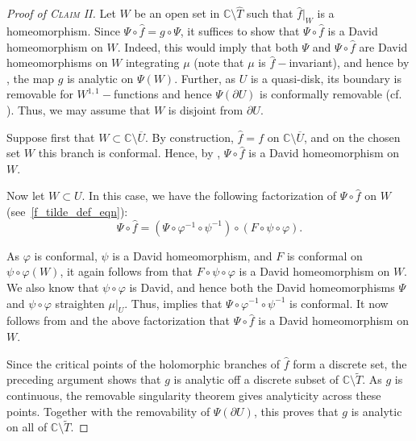 \documentclass[11pt,a4paper, oneside]{amsart}
\theoremstyle{definition}
\theoremstyle{remark}
\numberwithin{equation}{section}
\renewcommand{\hat}{\widehat}
\newcommand{\C}{\mathbb{C}}
\renewcommand{\tilde}{\widetilde}
\renewcommand{\phi}{\varphi}
\begin{document}
\begin{proof}[Proof of \textsc{Claim II}]
Let $W$ be an open set in $\C\setminus\widehat{T}$ such that $\hat f \vert_W$ is a homeomorphism. Since $\Psi\circ\hat f=g\circ \Psi$, it suffices to show that $\Psi\circ\hat f$ is a David homeomorphism on $W$. Indeed, this would imply that both $\Psi$ and $\Psi\circ\hat f$ are David homeomorphisms on $W$ integrating $\mu$ (note that $\mu$ is $\hat f-$invariant), and hence by \cite[Theorem~20.4.19, p.~565]{David}, the map $g$ is analytic on {$\Psi(W)$}.
Further, as $U$ is a quasi-disk, its boundary is removable for $W^{1,1}-$functions and hence $\Psi(\partial U)$ is conformally removable (cf. \cite[\S 2]{LMMN}). Thus, we may assume that $W$ is disjoint from $\partial U$.

Suppose first that $W\subset \C\setminus\overline{U}$. By construction, $\hat f=f$ on $\C\setminus\overline{U}$, and {on the chosen set $W$ this branch is conformal}. Hence, by \cite[Proposition~2.5, part (ii)]{LMMN}, $\Psi\circ\hat f$ is a David homeomorphism on $W$.



Now let $W\subset U$. In this case, we have the following factorization of $\Psi\circ\hat f$ on $W$ (see~\eqref{f_tilde_def_eqn}):
$$
\Psi\circ\hat f = \left(\Psi\circ\phi^{-1}\circ\psi^{-1}\right)\circ\left(F\circ \psi\circ\phi\right).
$$


As $\phi$ is conformal, $\psi$ is a David homeomorphism, and {$F$ is conformal on  $\psi\circ\phi(W)$}, it again follows from \cite[Proposition~2.5, parts (i) and (ii)]{LMMN} that $F\circ \psi\circ\phi$ is a David homeomorphism on $W$. We also know that $\psi\circ\phi$ is David, and hence both the David homeomorphisms $\Psi$ and $\psi\circ\phi$ straighten {$\mu|_U$}. Thus, \cite[Theorem~20.4.19, p.~565]{David} implies that $\Psi\circ\phi^{-1}\circ\psi^{-1}$ is conformal. It now follows from \cite[Proposition~2.5, part (i)]{LMMN} and the above factorization that $\Psi\circ\hat f$ is a David homeomorphism on $W$. 

{Since the critical points of the holomorphic branches of $\hat f$ form a discrete set, the preceding argument shows that $g$ is analytic off a discrete subset of $\C\setminus \tilde T$. As $g$ is continuous, the removable singularity theorem gives analyticity across these points. Together with the removability of $\Psi(\partial U)$, this proves that $g$ is analytic on all of $\C\setminus \tilde T$.}


\end{proof}
\end{document}
